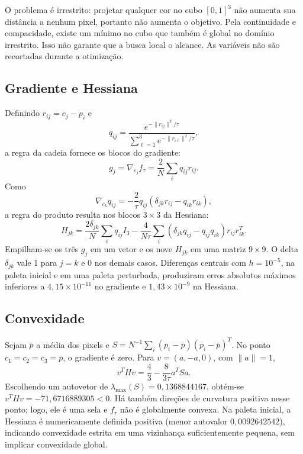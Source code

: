 \documentclass[12pt,a4paper]{article}
\begin{document}
O problema é irrestrito: projetar qualquer cor no cubo $[0,1]^3$ não aumenta
sua distância a nenhum pixel, portanto não aumenta o objetivo. Pela
continuidade e compacidade, existe um mínimo no cubo que também é global
no domínio irrestrito. Isso não garante que a busca local o alcance.
As variáveis não são recortadas durante a otimização.

\subsection{Gradiente e Hessiana}
Definindo $r_{ij}=c_j-p_i$ e
\[
q_{ij}=\frac{e^{-\|r_{ij}\|^2/\tau}}
{\sum_{\ell=1}^3e^{-\|r_{i\ell}\|^2/\tau}},
\]
a regra da cadeia fornece os blocos do gradiente:
\[
g_j=\nabla_{c_j}f_\tau=\frac2N\sum_iq_{ij}r_{ij}.
\]
Como
\[
\nabla_{c_k}q_{ij}=-\frac2\tau q_{ij}
(\delta_{jk}r_{ij}-q_{ik}r_{ik}),
\]
a regra do produto resulta nos blocos $3\times3$ da Hessiana:
\[
H_{jk}=\frac{2\delta_{jk}}N\sum_iq_{ij}I_3
-\frac4{N\tau}\sum_i(\delta_{jk}q_{ij}-q_{ij}q_{ik})r_{ij}r_{ik}^T.
\]
Empilham-se os três $g_j$ em um vetor e os nove $H_{jk}$ em uma matriz
$9\times9$. O delta $\delta_{jk}$ vale 1 para $j=k$ e 0 nos demais casos.
Diferenças centrais com $h=10^{-5}$, na paleta inicial e em uma paleta
perturbada, produziram erros absolutos máximos inferiores a
$4{,}15\times10^{-11}$ no gradiente e $1{,}43\times10^{-9}$ na Hessiana.

\subsection{Convexidade}
Sejam $\bar p$ a média dos pixels e
$S=N^{-1}\sum_i(p_i-\bar p)(p_i-\bar p)^T$.
No ponto $c_1=c_2=c_3=\bar p$, o gradiente é zero. Para
$v=(a,-a,0)$, com $\|a\|=1$,
\[
v^THv=\frac43-\frac8{3\tau}a^TSa.
\]
Escolhendo um autovetor de $\lambda_{\max}(S)=0{,}1368844167$,
obtém-se $v^THv=-71{,}6716889305<0$. Há também direções de curvatura
positiva nesse ponto; logo, ele é uma sela e $f_\tau$ não é globalmente
convexa. Na paleta inicial, a Hessiana é numericamente definida positiva
(menor autovalor $0{,}0092642542$), indicando convexidade estrita em uma
vizinhança suficientemente pequena, sem implicar convexidade global.
\end{document}
